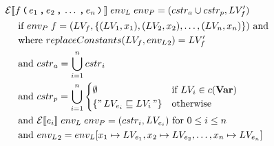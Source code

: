 \begin{align*}
& \mathcal{E}[\![ f \, \texttt{(} \, e_1 \, \texttt{,} \, e_2 \, \texttt{,} \, \dots \, \texttt{,} \, e_n \, \texttt{)} \, ]\!] \; {env_L} \; {env_P} = (cstr_a \cup cstr_p, LV_f') \\
& \quad \text{ if } {env_P} \; f = (LV_f, \{(LV_1, x_1), (LV_2, x_2), \dots, (LV_n, x_n)\}) \text{ and} \\
& \quad \text{ where } replaceConstants(LV_f, {env_L}_2) = LV_f' \\
& \quad \text{ and } {cstr}_a = \bigcup\limits_{i=1}^n {cstr}_i \\
& \quad \text{ and } {cstr}_p = \bigcup\limits_{i=1}^n
  \begin{cases}
    \emptyset &\text{if } LV_i \in c(\mathbf{Var})\\
    \{ "\,LV_{e_i} \sqsubseteq LV_i\," \} & \text{otherwise}
  \end{cases} \\
& \quad \text{ and } \mathcal{E}[\![ e_i ]\!] \; {env_L} \; {env_P} = (cstr_i, LV_{e_i}) \text{ for } 0 \leq i \leq n \\
& \quad \text{ and } {env_L}_2 = {env_L}[x_1 \mapsto LV_{e_1}, x_2 \mapsto LV_{e_2}, \dots, x_n \mapsto LV_{e_n}]
\end{align*}

